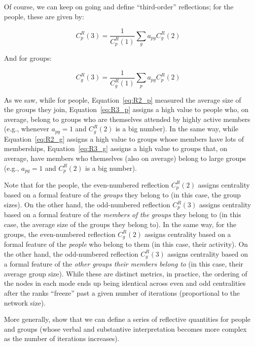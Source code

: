 \documentclass[a4paper,fleqn]{cas-sc}
\begin{document}
Of course, we can keep on going and define ``third-order'' reflections; for the people, these are given by:

\begin{equation}
   C^R_p(3) = \frac{1}{C^R_p(1)}\sum_g a_{pg}C^R_g(2)
   \label{eq:R3_p}
\end{equation}

And for groups:

\begin{equation}
   C^R_g(3) = \frac{1}{C^R_g(1)}\sum_p a_{pg}C^R_p(2)
   \label{eq:R3_g}
\end{equation}

As we saw, while for people, Equation~\ref{eq:R2_p} measured the average size of the groups they join, Equation~\ref{eq:R3_p} assigns a high value to people who, on average, belong to groups who are themselves attended by highly active members (e.g., whenever $a_{pg} = 1$ and $C^R_g(2)$ is a big number). In the same way, while Equation~\ref{eq:R2_g} assigns a high value to groups whose members have lots of memberships, Equation~\ref{eq:R3_g} assigns a high value to groups that, on average, have members who themselves (also on average) belong to large groups (e.g., $a_{pg} = 1$ and $C^R_p(2)$ is a big number).

Note that for the people, the even-numbered reflection $C^R_p(2)$ assigns centrality based on a formal feature of the \textit{groups} they belong to (in this case, the group sizes). On the other hand, the odd-numbered reflection $C^R_p(3)$ assigns centrality based on a formal feature of the \textit{members of the groups} they belong to (in this case, the average size of the groups they belong to). In the same way, for the groups, the even-numbered reflection $C^R_g(2)$ assigns centrality based on a formal feature of the \textit{people} who belong to them (in this case, their activity). On the other hand, the odd-numbered reflection $C^R_g(3)$ assigns centrality based on a formal feature of the \textit{other groups their members belong to} (in this case, their average group size). While these are distinct metrics, in practice, the ordering of the nodes in each mode ends up being identical across even and odd centralities after the ranks ``freeze'' past a given number of iterations (proportional to the network size). 

More generally, \citet{hidalgo2009building} show that we can define a series of reflective quantities for people and groups (whose verbal and substantive interpretation becomes more complex as the number of iterations increases). 
\end{document}
